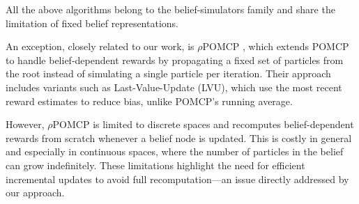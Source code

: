 	All the above algorithms belong to the belief-simulators family and share the limitation of fixed belief representations.  

	An exception, closely related to our work, is $\rho$POMCP \cite{Thomas21arxiv}, which extends POMCP to handle belief-dependent rewards by propagating a fixed set of particles from the root instead of simulating a single particle per iteration. Their approach includes variants such as Last-Value-Update (LVU), which use the most recent reward estimates to reduce bias, unlike POMCP’s running average.

	However, $\rho$POMCP is limited to discrete spaces and recomputes belief-dependent rewards from scratch whenever a belief node is updated. This is costly in general and especially in continuous spaces, where the number of particles in the belief can grow indefinitely. These limitations highlight the need for efficient incremental updates to avoid full recomputation—an issue directly addressed by our approach.





